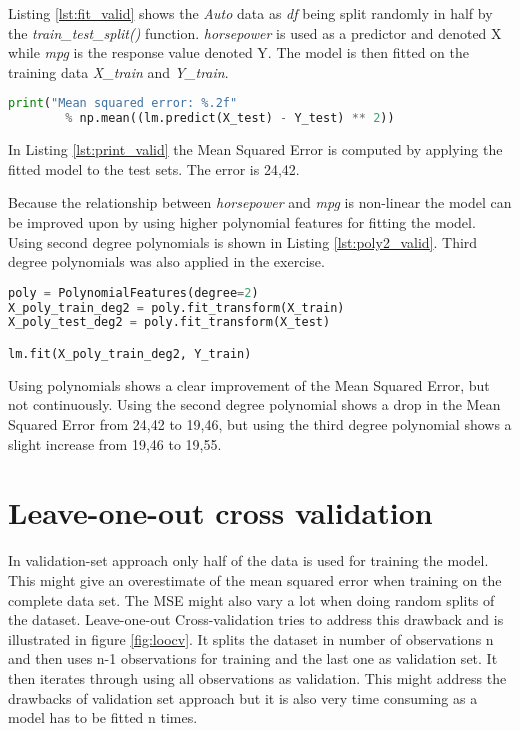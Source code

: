Listing \ref{lst:fit_valid} shows the \emph{Auto} data as \emph{df} being split randomly in half by the \emph{train\_test\_split()} function. 
\emph{horsepower} is used as a predictor and denoted X while \emph{mpg} is the response value denoted Y. The model is then fitted on the training data \emph{X\_train} and \emph{Y\_train}.

\begin{lstlisting}[language=Python, label=lst:print_valid, caption=Print Mean Squeared Error]
print("Mean squared error: %.2f" 
		% np.mean((lm.predict(X_test) - Y_test) ** 2))
\end{lstlisting}

In Listing \ref{lst:print_valid} the Mean Squared Error is computed by applying the fitted model to the test sets. The error is 24,42. 

Because the relationship between \emph{horsepower} and \emph{mpg} is non-linear the model can be improved upon by using higher polynomial features for fitting the model. Using second degree polynomials is shown in Listing \ref{lst:poly2_valid}. Third degree polynomials was also applied in the exercise.

\begin{lstlisting}[language=Python, label=lst:poly2_valid, caption=Polynomial features with degree = 2]
poly = PolynomialFeatures(degree=2)
X_poly_train_deg2 = poly.fit_transform(X_train)
X_poly_test_deg2 = poly.fit_transform(X_test)

lm.fit(X_poly_train_deg2, Y_train)
\end{lstlisting}

Using polynomials shows a clear improvement of the Mean Squared Error, but not continuously. Using the second degree polynomial shows a drop in the Mean Squared Error from 24,42 to 19,46, but using the third degree polynomial shows a slight increase from 19,46 to 19,55. 

\section{Leave-one-out cross validation}
In validation-set approach only half of the data is used for training the model. This might give an overestimate of the mean squared error when training on the complete data set. The MSE might also vary a lot when doing random splits of the dataset. Leave-one-out Cross-validation tries to address this drawback and is illustrated in figure \ref{fig:loocv}. It splits the dataset in number of observations n and then uses n-1 observations for training and the last one as validation set. It then iterates through using all observations as validation. This might address the drawbacks of validation set approach but it is also very time consuming as a model has to be fitted n times.

